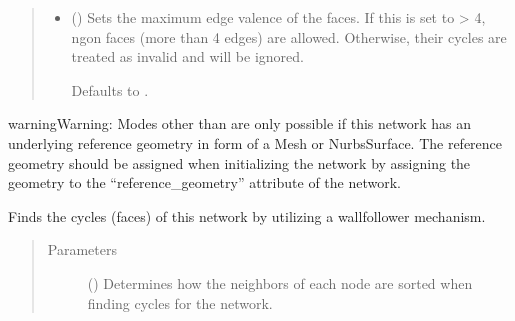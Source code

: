 \documentclass[letterpaper,10pt,english]{sphinxmanual}
\begin{document}
\begin{fulllineitems}
\begin{fulllineitems}
\begin{quote}
\begin{description}
\begin{itemize}
\item {} 
 (\sphinxstyleliteralemphasis{\sphinxupquote{, }}) \textendash{} 
Sets the maximum edge valence of the faces. If this is set to \textgreater{} 4,
n\sphinxhyphen{}gon faces (more than 4 edges) are allowed. Otherwise, their
cycles are treated as invalid and will be ignored.

Defaults to .


\end{itemize}

\end{description}\end{quote}

\begin{sphinxadmonition}{warning}{Warning:}
Modes other than  are only possible if this network has an
underlying reference geometry in form of a Mesh or NurbsSurface. The
reference geometry should be assigned when initializing the network by
assigning the geometry to the “reference\_geometry” attribute of the
network.
\end{sphinxadmonition}

\end{fulllineitems}


\begin{fulllineitems}
\label{\detokenize{cockatoo:cockatoo.KnitDiNetwork.find_cycles}}
Finds the cycles (faces) of this network by utilizing a wall\sphinxhyphen{}follower
mechanism.
\begin{quote}\begin{description}
\item[{Parameters}] \leavevmode
{} (\sphinxstyleliteralemphasis{\sphinxupquote{, }}) \textendash{} 
Determines how the neighbors of each node are sorted when finding
cycles for the network.


\end{description}
\end{quote}
\end{fulllineitems}
\end{fulllineitems}
\end{document}
